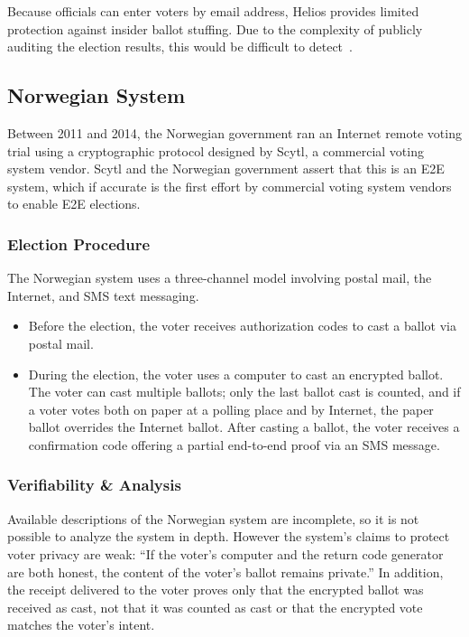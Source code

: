 Because officials can enter voters by email address, Helios provides
limited protection against insider ballot stuffing. Due to the
complexity of publicly auditing the election results, this would be
difficult to detect~\cite{orion2009}.

\subsection{Norwegian System~\cite{gjosteen2012}}

Between 2011 and 2014, the Norwegian government ran an Internet remote
voting trial using a cryptographic protocol designed by Scytl, a
commercial voting system vendor. Scytl and the Norwegian government
assert that this is an E2E system, which if accurate is the first
effort by commercial voting system vendors to enable E2E
elections.

\subsubsection{Election Procedure}

The Norwegian system uses a three-channel model involving postal mail,
the Internet, and SMS text messaging.

\begin{itemize}

\item Before the election, the voter receives authorization codes to
  cast a ballot via postal mail.

\item During the election, the voter uses a computer to cast an
  encrypted ballot. The voter can cast multiple ballots; only the
  last ballot cast is counted, and if a voter votes both on paper at a
  polling place and by Internet, the paper ballot overrides the
  Internet ballot. After casting a ballot, the voter receives a
  confirmation code offering a partial end-to-end proof via an SMS
  message.

\end{itemize}

\subsubsection{Verifiability \& Analysis}

Available descriptions of the Norwegian system are incomplete, so it
is not possible to analyze the system in depth. However the system's
claims to protect voter privacy are weak: ``If the voter's computer
and the return code generator are both honest, the content of the
voter's ballot remains private.'' In addition, the receipt delivered
to the voter proves only that the encrypted ballot was received as
cast, not that it was counted as cast or that the encrypted vote
matches the voter's intent.

